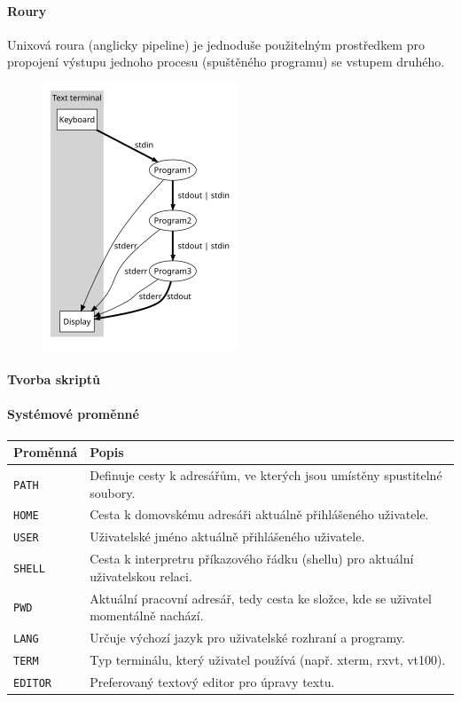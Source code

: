 \paragraph{Roury}
Unixová roura (anglicky pipeline) je jednoduše použitelným prostředkem pro propojení výstupu jednoho procesu (spuštěného programu) se vstupem druhého.
\begin{figure}[htbp]
\centering
\includegraphics[scale=0.5]{sections/12_unix/images/Pipeline-notitle.svg.png}
\end{figure}

\paragraph{Tvorba skriptů}

\paragraph{Systémové proměnné}
\begin{center}
\begin{tabular}{|l|p{10cm}|}
\hline
\textbf{Proměnná} & \textbf{Popis} \\
\hline
\texttt{PATH} & Definuje cesty k adresářům, ve kterých jsou umístěny spustitelné soubory. \\
\hline
\texttt{HOME} & Cesta k domovskému adresáři aktuálně přihlášeného uživatele. \\
\hline
\texttt{USER} & Uživatelské jméno aktuálně přihlášeného uživatele. \\
\hline
\texttt{SHELL} & Cesta k interpretru příkazového řádku (shellu) pro aktuální uživatelskou relaci. \\
\hline
\texttt{PWD} & Aktuální pracovní adresář, tedy cesta ke složce, kde se uživatel momentálně nachází. \\
\hline
\texttt{LANG} & Určuje výchozí jazyk pro uživatelské rozhraní a programy. \\
\hline
\texttt{TERM} & Typ terminálu, který uživatel používá (např. xterm, rxvt, vt100). \\
\hline
\texttt{EDITOR} & Preferovaný textový editor pro úpravy textu. \\
\hline
\end{tabular}
\end{center}

